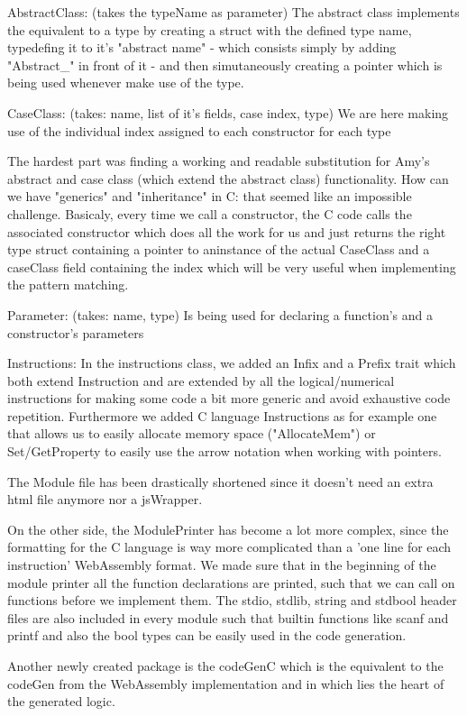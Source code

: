 AbstractClass: (takes the typeName as parameter)
The abstract class implements the equivalent to a type by creating a struct with the defined type name, typedefing it to
it's "abstract name" - which consists simply by adding "Abstract_" in front of it - and then simutaneously creating a pointer
which is being used whenever make use of the type.

CaseClass: (takes: name, list of it's fields, case index, type)
We are here making use of the individual index assigned to each constructor for each type

The hardest part was finding a working and readable substitution for Amy's abstract and case class (which extend the abstract class) functionality.
How can we have "generics" and "inheritance" in C: that seemed like an impossible challenge.
Basicaly, every time we call a constructor, the C code calls the associated constructor which does all the work for us and
just returns the right type struct containing a pointer to aninstance of the actual CaseClass and a caseClass field containing
the index which will be very useful when implementing the pattern matching.

Parameter: (takes: name, type)
Is being used for declaring a function's and a constructor's parameters

Instructions:
In the instructions class, we added an Infix and a Prefix trait which both extend Instruction and are extended by all the
logical/numerical instructions for making some code a bit more generic and avoid exhaustive code repetition.
Furthermore we added C language Instructions as for example one that allows us to easily allocate memory space ("AllocateMem")
or Set/GetProperty to easily use the arrow notation when working with pointers.

The Module file has been drastically shortened since it doesn't need an extra html file anymore nor a jsWrapper.

On the other side, the ModulePrinter has become a lot more complex, since the formatting for the C language is way more
complicated than a 'one line for each instruction' WebAssembly format.
We made sure that in the beginning of the module printer all the function declarations are printed, such that we can call
on functions before we implement them.
The stdio, stdlib, string and stdbool header files are also included in every module such that builtin functions like scanf
and printf and also the bool types can be easily used in the code generation.

Another newly created package is the codeGenC which is the equivalent to the codeGen from the WebAssembly implementation
and in which lies the heart of the generated logic.

